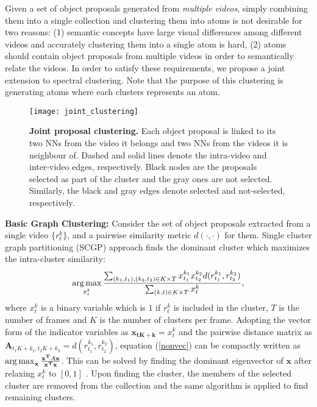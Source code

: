 Given a set of object proposals generated from \emph{multiple videos}, simply combining them into a single collection and clustering them into atoms is not desirable for two reasons: (1) semantic concepts have large visual differences among different videos and accurately clustering them into a single atom is hard, (2) atoms should contain object proposals from multiple videos in order to semantically relate the videos. In order to satisfy these requirements, we propose a joint extension to spectral clustering. Note that the purpose of this clustering is generating atoms where each clusters represents an atom.

\begin{figure}[ht]
  \texttt{[image: joint\_clustering]}
  \vskip -2mm
\caption{\textbf{Joint proposal clustering.} Each object proposal is linked to its two NNs from the video it belongs and two NNs from the videos it is neighbour of. Dashed and solid lines denote the intra-video and inter-video edges, respectively. Black nodes are the proposals selected as part of the cluster and the gray ones are not selected. Similarly, the black and gray edges denote selected and not-selected, respectively.}
  \label{hierProposal}
    \vskip -1mm
\end{figure}

\noindent\textbf{Basic Graph Clustering:} Consider the set of object proposals extracted from a single video $\{r^k_t\}$, and a pairwise similarity metric $d(\cdot,\cdot)$ for them. Single cluster graph partitioning (SCGP)\cite{scgp} approach finds the dominant cluster which maximizes the intra-cluster similarity:
\begin{equation}
  \argmax_{x^k_t} \frac{\sum_{(k_1,t_1),(k_2,t_2) \in K \times T} x^{k_1}_{t_1} x^{k_2}_{t_2} d(r^{k_1}_{t_1},r^{k_2}_{t_2})}{\sum_{(k,t) \in K \times T} x^{k}_t},
  \label{nonvec}
\end{equation}
where $x^{k}_t$ is a binary variable which is $1$ if $r^{k}_t$ is included in the cluster, $T$ is the number of frames and $K$ is the number of clusters per frame. Adopting the vector form of the indicator variables as $\mathbf{x_{tK+k}}=x^{k}_{t}$ and the pairwise distance matrix as $\mathbf{A}_{t_1K+k_1,t_2K+k_2}=d(r^{k_1}_{t_1},r^{k_2}_{t_2})$, equation (\ref{nonvec}) can be compactly written as
$\operatorname*{arg\,max}_{\mathbf{x}} \frac{\mathbf{x^T}A\mathbf{x}}{\mathbf{x^T}\mathbf{x}}$.
This can be solved by finding the dominant eigenvector of $\mathbf{x}$ after relaxing $x^{k}_t$ to $[0,1]$ \cite{scgp,scgp_eigen}. Upon finding the cluster, the members of the selected cluster are removed from the collection and the same algorithm is applied to find remaining clusters.

